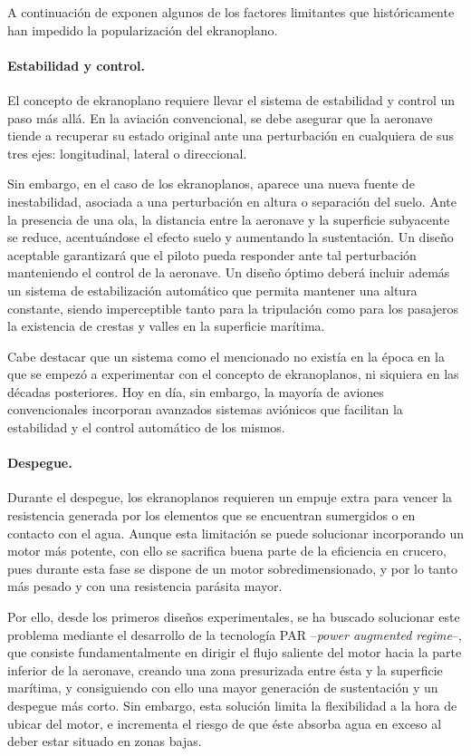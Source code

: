 A continuación de exponen algunos de los factores limitantes que históricamente han impedido la popularización del ekranoplano.

\paragraph{Estabilidad y control.} El concepto de ekranoplano requiere llevar el sistema de estabilidad y control un paso más allá. En la aviación convencional, se debe asegurar que la aeronave tiende a recuperar su estado original ante una perturbación en cualquiera de sus tres ejes: longitudinal, lateral o direccional.

Sin embargo, en el caso de los ekranoplanos, aparece una nueva fuente de inestabilidad, asociada a una perturbación en altura o separación del suelo. Ante la presencia de una ola, la distancia entre la aeronave y la superficie subyacente se reduce, acentuándose el efecto suelo y aumentando la sustentación. Un diseño aceptable garantizará que el piloto pueda responder ante tal perturbación manteniendo el control de la aeronave. Un diseño óptimo deberá incluir además un sistema de estabilización automático que permita mantener una altura constante, siendo imperceptible tanto para la tripulación como para los pasajeros la existencia de crestas y valles en la superficie marítima.

Cabe destacar que un sistema como el mencionado no existía en la época en la que se empezó a experimentar con el concepto de ekranoplanos, ni siquiera en las décadas posteriores. Hoy en día, sin embargo, la mayoría de aviones convencionales incorporan avanzados sistemas aviónicos que facilitan la estabilidad y el control automático de los mismos.

\paragraph{Despegue.} Durante el despegue, los ekranoplanos requieren un empuje extra para vencer la resistencia generada por los elementos que se encuentran sumergidos o en contacto con el agua. Aunque esta limitación se puede solucionar incorporando un motor más potente, con ello se sacrifica buena parte de la eficiencia en crucero, pues durante esta fase se dispone de un motor sobredimensionado, y por lo tanto más pesado y con una resistencia parásita mayor.

Por ello, desde los primeros diseños experimentales, se ha buscado solucionar este problema mediante el desarrollo de la tecnología PAR –\emph{power augmented regime}–, que consiste fundamentalmente en dirigir el flujo saliente del motor hacia la parte inferior de la aeronave, creando una zona presurizada entre ésta y la superficie marítima, y consiguiendo con ello una mayor generación de sustentación y un despegue más corto. Sin embargo, esta solución limita la flexibilidad a la hora de ubicar del motor, e incrementa el riesgo de que éste absorba agua en exceso al deber estar situado en zonas bajas.


